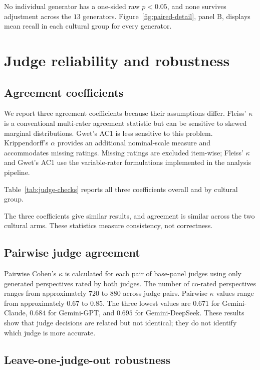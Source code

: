 \documentclass[11pt,a4paper]{article}
\begin{document}
No individual generator has a one-sided raw $p<0.05$, and none survives adjustment across the $13$ generators.
Figure~\ref{fig:paired-detail}, panel B, displays mean recall in each cultural group for every generator.

\section{Judge reliability and robustness}
\label{app:reliability}

\subsection{Agreement coefficients}
\label{app:agreement_coefficients}

We report three agreement coefficients because their assumptions differ. Fleiss' $\kappa$ is a conventional multi-rater agreement statistic but can be sensitive to skewed marginal distributions. Gwet's AC1 is less sensitive to this problem. Krippendorff's $\alpha$ provides an additional nominal-scale measure and accommodates missing ratings. Missing ratings are excluded item-wise; Fleiss' $\kappa$ and Gwet's AC1 use the variable-rater formulations implemented in the analysis pipeline.

Table~\ref{tab:judge-checks} reports all three coefficients overall and by cultural group.

The three coefficients give similar results, and agreement is similar across the two cultural arms. These statistics measure consistency, not correctness.

\subsection{Pairwise judge agreement}
\label{app:pairwise_judges}

Pairwise Cohen's $\kappa$ is calculated for each pair of base-panel judges using only generated perspectives rated by both judges. The number of co-rated perspectives ranges from approximately $720$ to $880$ across judge pairs. Pairwise $\kappa$ values range from approximately $0.67$ to $0.85$. The three lowest values are $0.671$ for Gemini-Claude, $0.684$ for Gemini-GPT, and $0.695$ for Gemini-DeepSeek. These results show that judge decisions are related but not identical; they do not identify which judge is more accurate.

\subsection{Leave-one-judge-out robustness}
\label{app:lojo}
\end{document}

